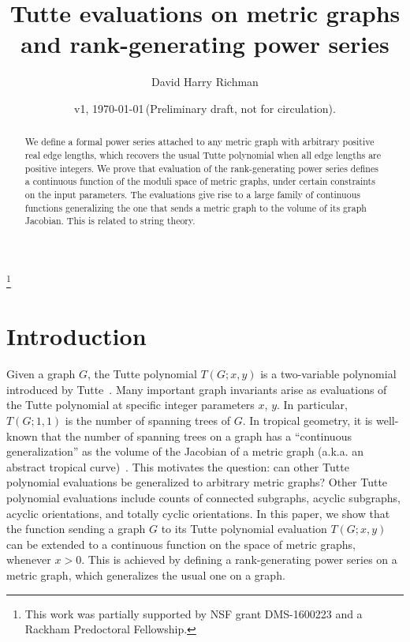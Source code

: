 \documentclass{amsart}
\theoremstyle{definition}
\begin{document}
\title
[Tutte evaluations on metric graphs]
{Tutte evaluations on metric graphs and rank-generating power series}
\author{David Harry Richman}
\date{v1, \today  \,(Preliminary draft, not for circulation).}
\thanks{This work was partially supported by NSF grant DMS-1600223
and a Rackham Predoctoral Fellowship.}


\begin{abstract}
We define a formal power series 
attached to any metric graph with arbitrary positive real edge lengths, 
which recovers the usual Tutte polynomial when all edge lengths are positive integers.
We prove that %
evaluation of the rank-generating power series
defines a continuous function of the moduli space of metric graphs,
under certain constraints on the input parameters.
The evaluations give rise to a large family of continuous functions generalizing the one that sends a metric graph to the volume of its graph Jacobian.
This is related to string theory.
\end{abstract}
\maketitle

\setcounter{tocdepth}{1}
\tableofcontents

\section{Introduction}
Given a graph $G$, the Tutte polynomial $T(G;x,y)$ is 
a two-variable polynomial %
introduced by Tutte~\cite{Tut}.
Many important graph invariants arise as evaluations of 
the Tutte polynomial %
at specific integer parameters $x$, $y$.
In particular, $T(G; 1, 1)$ is the number of spanning trees of $G$.
In tropical geometry, it is well-known that the number of spanning trees on a graph has a ``continuous generalization'' as the volume of the Jacobian of a metric graph (a.k.a. an abstract tropical curve)~\cites{MZ,BF,ABKS}.
This motivates the question: can other Tutte polynomial evaluations be generalized to arbitrary metric graphs?
Other Tutte polynomial evaluations include counts of 
connected subgraphs, acyclic subgraphs,
acyclic orientations, and totally cyclic orientations.
In this paper, we show that the function sending a graph $G$ to its Tutte polynomial evaluation $T(G; x, y)$ can be extended to a continuous function on the space of metric graphs, whenever $x > 0$.
This is achieved by defining a rank-generating power series on a metric graph,
which generalizes the usual one on a graph.
\end{document}
